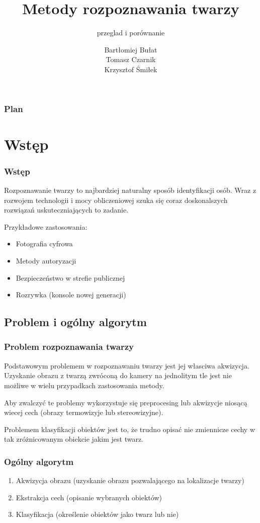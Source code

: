 \documentclass[xcolor=table]{beamer}
\title{Metody rozpoznawania twarzy}
\subtitle{przeglad i porównanie}
\author{Bartłomiej Bułat\\
Tomasz Czarnik\\
Krzysztof Śmiłek\\}
\begin{document}
\begin{frame}
  \titlepage
\end{frame}


\begin{frame}
  \frametitle{Plan}
  \tableofcontents
\end{frame}


\section{Wstęp}

\begin{frame}
  \frametitle{Wstęp}
  Rozpoznawanie twarzy to najbardziej naturalny sposób identyfikacji osób. Wraz z rozwojem technologii i mocy obliczeniowej szuka się coraz doskonalszych rozwiązań uskuteczniających to zadanie.\\[\baselineskip]
 {Przykładowe zastosowania:
\begin{itemize}
\item Fotografia cyfrowa
\item Metody autoryzacji
\item Bezpieczeństwo w strefie publicznej
\item Rozrywka (konsole nowej generacji)
\end{itemize}}
\end{frame}

\subsection{Problem i ogólny algorytm}
\begin{frame}
\frametitle{Problem rozpoznawania twarzy}

Podstawowym problemem w rozpoznawaniu twarzy jest jej własciwa akwizycja. Uzyskanie obrazu z twarzą zwróconą do kamery na jednolitym tle jest nie możliwe w wielu przypadkach zastosowania metody.
\pause

Aby zwalczyć te problemy wykorzystuje się preprocesing lub akwizycje niosącą wiecej cech (obrazy termowizyje lub stereowizyjne).
\pause

Problemem klasyfikacji obiektów jest to, że trudno opisać nie zmiennicze cechy w tak zróżnicowanym obiekcie jakim jest twarz.   

\end{frame}

\begin{frame}
  \frametitle{Ogólny algorytm}

\begin{enumerate}
\item Akwizycja obrazu (uzyskanie obrazu pozwalającego na lokalizacje twarzy) \pause
\item Ekstrakcja cech (opisanie wybranych obiektów) \pause
\item Klasyfikacja (określenie obiektów jako twarz lub nie)
\end{enumerate}
   
\end{frame}
\end{document}

